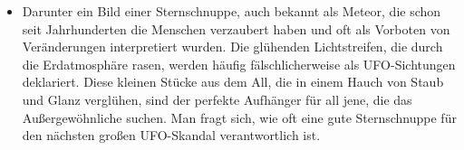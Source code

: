 \documentclass{scrartcl}
\begin{document}
\begin{itemize}
	\item Darunter ein Bild einer Sternschnuppe, auch bekannt als Meteor, die schon seit Jahrhunderten die Menschen verzaubert haben und oft als Vorboten von Veränderungen interpretiert wurden. Die glühenden Lichtstreifen, die durch die Erdatmosphäre rasen, werden häufig fälschlicherweise als UFO-Sichtungen deklariert. Diese kleinen Stücke aus dem All, die in einem Hauch von Staub und Glanz verglühen, sind der perfekte Aufhänger für all jene, die das Außergewöhnliche suchen. Man fragt sich, wie oft eine gute Sternschnuppe für den nächsten großen UFO-Skandal verantwortlich ist. 
\end{itemize}
\end{document}
